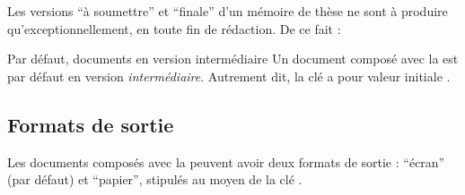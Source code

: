 Les versions \enquote{à soumettre} et \enquote{finale} d'un mémoire de thèse ne
sont à produire qu'exceptionnellement, en toute fin de rédaction. De ce fait :
\begin{dbwarning}{Par défaut, documents en version intermédiaire}{}
  Un document composé avec la \yatcl{} est par défaut en version
  \emph{intermédiaire}. Autrement dit, la clé  a pour valeur
  initiale .
\end{dbwarning}

\subsection{Formats de sortie}
\label{sec:formats-de-sortie}

Les documents composés avec la \yatcl{} peuvent avoir deux formats de sortie :
\enquote{écran} (par défaut) et \enquote{papier}, stipulés au moyen de la clé
.

